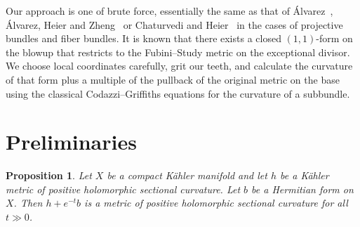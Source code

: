 \documentclass[10pt,a4paper]{amsart}
\newtheorem{prop}[theo]{Proposition}
\def\hsc{holomorphic sectional curvature}
\begin{document}
Our approach is one of brute force, essentially the same as that of
\'Alvarez~\cite{alvarez2016positive},
\'Alvarez,
Heier and Zheng~\cite{alvarez2018projectivized} or Chaturvedi and
Heier~\cite{chaturvedi2020hermitian} in the cases of projective bundles and
fiber bundles. It is known that there exists a closed $(1,1)$-form on the
blowup that restricts to the Fubini--Study metric on the exceptional divisor.
We choose local coordinates carefully, grit our teeth, and calculate the
curvature of that form plus a multiple of the pullback of the original metric
on the base using the classical Codazzi--Griffiths equations for the curvature
of a subbundle.



\section{Preliminaries}

\begin{prop}
\label{prop:positive}
Let $X$ be a compact K\"ahler manifold and let $h$ be a K\"ahler metric of
positive \hsc. Let $b$ be a Hermitian form on $X$.
Then $h + e^{-t} b$ is a metric of positive \hsc{} for all $t \gg 0$.
\end{prop}
\end{document}
